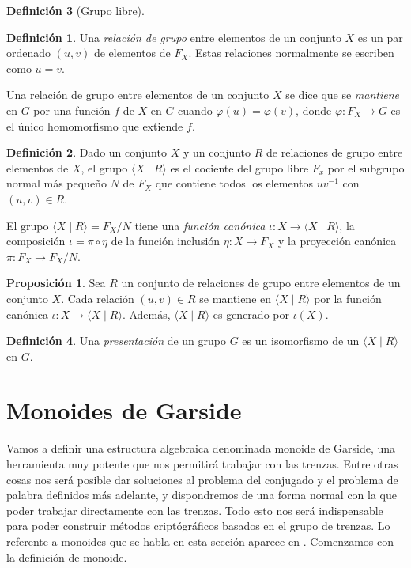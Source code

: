\documentclass[12pt]{book}
\theoremstyle{definition}
\newtheorem{defi}{Definición}[section]
\newtheorem{prop}{Proposición}[section]
\begin{document}
\begin{defi}[Grupo libre]
\begin{defi}
Una \textit{relación de grupo} entre elementos de un conjunto $X$ es un par ordenado $(u,v)$ de elementos de $F_X$. Estas relaciones normalmente se escriben como $u=v$.
\end{defi}

Una relación de grupo entre elementos de un conjunto $X$ se dice que se \textit{mantiene} en $G$ por una función $f$ de $X$ en $G$ cuando $\varphi(u)=\varphi(v)$, donde $\varphi:F_X\rightarrow G$ es el único homomorfismo que extiende $f$.

\begin{defi}
Dado un conjunto $X$ y un conjunto $R$ de relaciones de grupo entre elementos de $X$, el grupo $\langle X\mid R \rangle$ es el cociente del grupo libre $F_x$ por el subgrupo normal más pequeño $N$ de $F_X$ que contiene todos los elementos $uv^{-1}$ con $(u,v)\in R$.
\end{defi}

El grupo $\langle X\mid R \rangle = F_X/N$ tiene una \textit{función canónica} $\iota:X\rightarrow \langle X\mid R \rangle$, la composición $\iota =\pi\circ\eta$ de la función inclusión $\eta:X\rightarrow F_X$ y la proyección canónica $\pi:F_X\rightarrow F_X/N$.
\begin{prop}
Sea $R$ un conjunto de relaciones de grupo entre elementos de un conjunto $X$. Cada relación $(u,v)\in R$ se mantiene en $\langle X\mid R \rangle$ por la función canónica $\iota:X\rightarrow\langle X\mid R \rangle$. Además, $\langle X\mid R \rangle$ es generado por $\iota(X)$.
\end{prop}

\end{defi}

\begin{defi}
Una \textit{presentación} de un grupo $G$ es un isomorfismo de un $\langle X\mid R \rangle$ en $G$.
\end{defi}






\chapter{Monoides de Garside}

Vamos a definir una estructura algebraica denominada monoide de Garside, una herramienta muy potente que nos permitirá trabajar con las trenzas. Entre otras cosas nos será posible dar soluciones al problema del conjugado y el problema de palabra definidos más adelante, y dispondremos de una forma normal con la que poder trabajar directamente con las trenzas. Todo esto nos será indispensable para poder construir métodos criptógráficos basados en el grupo de trenzas. Lo referente a monoides que se habla en esta sección aparece en \cite{br_gr}. Comenzamos con la definición de monoide.
\end{document}
